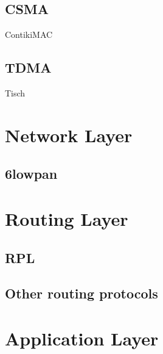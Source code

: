 \subsection{CSMA} %
\label{sub:csma}

ContikiMAC


\subsection{TDMA} %
\label{sub:tdma}

Tisch



\section{Network Layer} %
\label{sec:network_layer}

\subsection{6lowpan} %
\label{sub:6lowpan}

\lipsum



\section{Routing Layer} %
\label{sec:routing_layer}

\subsection{RPL} %
\label{sub:rpl}


\subsection{Other routing protocols} %
\label{sub:other_routing_protocols}



\section{Application Layer} %
\label{sec:application_layer}

